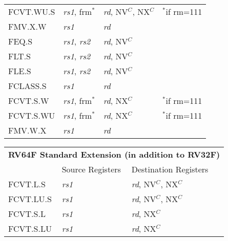 \begin{tabular}{p{25mm}|p{3cm}|p{6cm}|p{10cm}}
   FCVT.WU.S & {\em rs1}, frm$^*$ & {\em rd}, NV$^C$, NX$^C$ & $^*$if rm=111 \\
   \cline{2-3}
   FMV.X.W & {\em rs1} & {\em rd} &  \\
   \cline{2-3}
   FEQ.S & {\em rs1}, {\em rs2} & {\em rd}, NV$^C$ &  \\
   \cline{2-3}
   FLT.S & {\em rs1}, {\em rs2} & {\em rd}, NV$^C$ &  \\
   \cline{2-3}
   FLE.S & {\em rs1}, {\em rs2} & {\em rd}, NV$^C$ &  \\
   \cline{2-3}
   FCLASS.S & {\em rs1} & {\em rd} &  \\
   \cline{2-3}
   FCVT.S.W & {\em rs1}, frm$^*$ & {\em rd}, NX$^C$ & $^*$if rm=111 \\
   \cline{2-3}
   FCVT.S.WU & {\em rs1}, frm$^*$ & {\em rd}, NX$^C$ & $^*$if rm=111 \\
   \cline{2-3}
   FMV.W.X & {\em rs1} & {\em rd} &  \\
   \cline{2-3}
\end{tabular}

\begin{tabular}{p{25mm}|p{3cm}|p{6cm}|p{10cm}}
  \multicolumn{4}{l}{\bf RV64F Standard Extension (in addition to RV32F)} \\
  \cline{2-3}
   & Source Registers & Destination Registers \\
  \cline{2-3}
   FCVT.L.S & {\em rs1} & {\em rd}, NV$^C$, NX$^C$ &  \\
   \cline{2-3}
   FCVT.LU.S & {\em rs1} & {\em rd}, NV$^C$, NX$^C$ &  \\
   \cline{2-3}
   FCVT.S.L & {\em rs1} & {\em rd}, NX$^C$ &  \\
   \cline{2-3}
   FCVT.S.LU & {\em rs1} & {\em rd}, NX$^C$ &  \\
   \cline{2-3}
\end{tabular}

